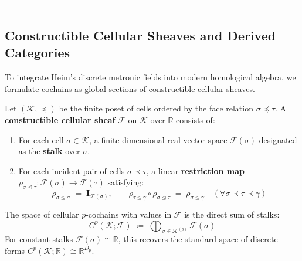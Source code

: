 \documentclass[
    12pt,
    a4paper,
    headings=normal,
    twoside=false,
    open=any,
    parskip=half
]{scrbook}
\begin{document}
---

\subsection{Constructible Cellular Sheaves and Derived Categories}

To integrate Heim's discrete metronic fields into modern homological algebra, we formulate cochains as global sections of constructible cellular sheaves.

\begin{physdefinition}\label{def:ch1_cellular_sheaf}
Let $(\mathcal{K}, \preceq)$ be the finite poset of cells ordered by the face relation $\sigma \preceq \tau$. A \textbf{constructible cellular sheaf} $\mathscr{F}$ on $\mathcal{K}$ over $\mathbb{R}$ consists of:
\begin{enumerate}[label=(\alph*), noitemsep]
    \item For each cell $\sigma \in \mathcal{K}$, a finite-dimensional real vector space $\mathscr{F}(\sigma)$ designated as the \textbf{stalk} over $\sigma$.
    \item For each incident pair of cells $\sigma \prec \tau$, a linear \textbf{restriction map} $\rho_{\sigma \trianglelefteq \tau} \colon \mathscr{F}(\sigma) \to \mathscr{F}(\tau)$ satisfying:
    \begin{equation}
    \rho_{\sigma \trianglelefteq \sigma} \;=\; \mathbf{I}_{\mathscr{F}(\sigma)}, \qquad \rho_{\tau \trianglelefteq \gamma} \circ \rho_{\sigma \trianglelefteq \tau} \;=\; \rho_{\sigma \trianglelefteq \gamma} \quad (\forall \sigma \prec \tau \prec \gamma)
    \end{equation}
\end{enumerate}
The space of cellular $p$-cochains with values in $\mathscr{F}$ is the direct sum of stalks:
\begin{equation}
C^p(\mathcal{K}; \mathscr{F}) \;\coloneqq\; \bigoplus_{\sigma \in \mathcal{K}^{(p)}} \mathscr{F}(\sigma)
\end{equation}
For constant stalks $\mathscr{F}(\sigma) \cong \mathbb{R}$, this recovers the standard space of discrete forms $C^p(\mathcal{K}; \mathbb{R}) \cong \mathbb{R}^{D_p}$.
\end{physdefinition}
\end{document}

